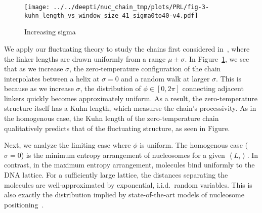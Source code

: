 \documentclass[%
 reprint,
superscriptaddress,
showpacs,preprintnumbers,
 amsmath,amssymb,
 aps,
 prl,
]{revtex4-1}
\newcommand{\meanli}{\left\langle{}L_i\right\rangle}
\begin{document}
\begin{figure}
    \centering
    \texttt{[image: ../../deepti/nuc\_chain\_tmp/plots/PRL/fig-3-kuhn\_length\_vs\_window\_size\_41\_sigma0to40-v4.pdf]}
    \caption{Increasing sigma}\label{fig:hetero-geom}
\end{figure}

We apply our fluctuating theory to study the chains first considered
    in~\cite{woodcock1993}, where the linker lengths are drawn uniformly from a
    range $\mu \pm \sigma$.
In Figure~\ref{fig:hetero-geom}, we see that as we increase $\sigma$, the
    zero-temperature configuration of the chain interpolates between a helix at
    $\sigma = 0$ and a random walk at larger $\sigma$.
This is because as we increase $\sigma$, the distribution of $\phi \in [0, 2\pi]$ connecting
    adjacent linkers quickly becomes approximately uniform.
%
As a result, the zero-temperature structure itself has a Kuhn length, which measurse
the chain's processivity.
As in the homogenous case, the Kuhn length of the
zero-temperature chain qualitatively predicts that of the fluctuating structure,
as seen in Figure.

Next, we analyze the limiting case where $\phi$ is uniform.
The homogenous case ($\sigma=0$) is the
    minimum entropy arrangement of nucleosomes for a given $\meanli$. In
    contrast, in the maximum entropy arrangement, molecules bind uniformly to
    the DNA lattice. For a sufficiently large lattice, the distances separating the
    molecules are well-approximated by exponential, i.i.d.\ random variables.
This is also exactly the distribution implied by  state-of-the-art models of nucleosome
    positioning~\cite{beshnova2014}.
\end{document}
